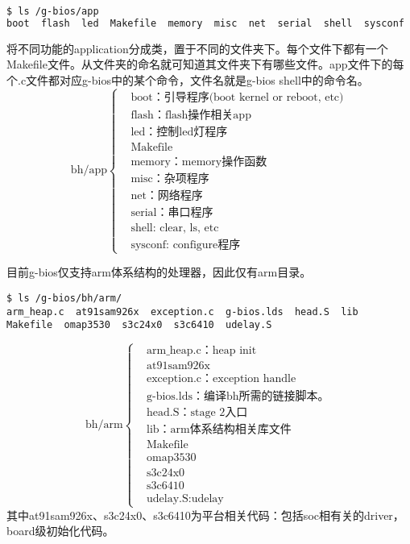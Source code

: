 \begin{lstlisting}[language=bash, numbers=none]
$ ls /g-bios/app
boot  flash  led  Makefile  memory  misc  net  serial  shell  sysconf
\end{lstlisting}
将不同功能的application分成类，置于不同的文件夹下。每个文件下都有一个Makefile文件。从文件夹的命名就可知道其文件夹下有哪些文件。app文件下的每个.c文件都对应g-bios中的某个命令，文件名就是g-bios shell中的命令名。
\begin{equation*}
\text{bh/app}
\left\{
	\begin{aligned}
	&\text{boot：引导程序(boot kernel or reboot, etc)} \\
	&\text{flash：flash操作相关app} \\
	&\text{led：控制led灯程序} \\
	&\text{Makefile} \\
	&\text{memory：memory操作函数} \\
	&\text{misc：杂项程序} \\
	&\text{net：网络程序} \\
	&\text{serial：串口程序} \\
	&\text{shell: clear, ls, etc} \\
	&\text{sysconf: configure程序}
	\end{aligned}
\right.
\end{equation*}

目前g-bios仅支持arm体系结构的处理器，因此仅有arm目录。
\begin{lstlisting}[language={SH},numbers=none]
$ ls /g-bios/bh/arm/
arm_heap.c  at91sam926x  exception.c  g-bios.lds  head.S  lib  Makefile  omap3530  s3c24x0  s3c6410  udelay.S
\end{lstlisting}

\begin{equation*}
\text{bh/arm}
\left\{
	\begin{aligned}
	&\text{arm\_heap.c：heap init} \\
	&\text{at91sam926x} \\
	&\text{exception.c：exception handle} \\
	&\text{g-bios.lds：编译bh所需的链接脚本。} \\
	&\text{head.S：stage 2入口} \\
	&\text{lib：arm体系结构相关库文件} \\
	&\text{Makefile}\\
	&\text{omap3530}\\
	&\text{s3c24x0}\\
	&\text{s3c6410}\\
	&\text{udelay.S:udelay}
	\end{aligned}
\right.
\end{equation*}
其中at91sam926x、s3c24x0、s3c6410为平台相关代码：包括soc相有关的driver，board级初始化代码。

